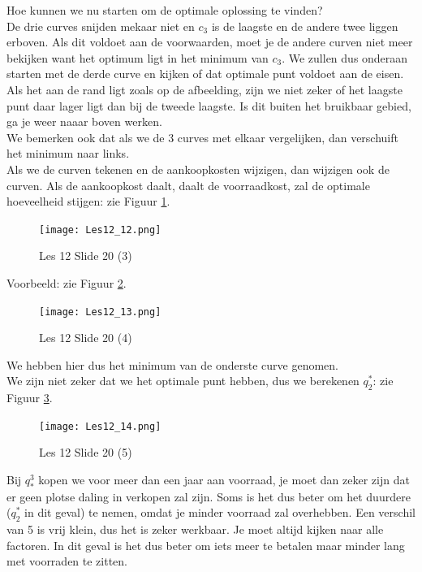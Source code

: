 \documentclass[10pt,a4paper]{report}
\begin{document}
Hoe kunnen we nu starten om de optimale oplossing te vinden? \\
De drie curves snijden mekaar niet en $c_{3}$ is de laagste en de andere twee liggen erboven. Als dit voldoet aan de voorwaarden, moet je de andere curven niet meer bekijken want het optimum ligt in het minimum van $c_{3}$. We zullen dus onderaan starten met de derde curve en kijken of dat optimale punt voldoet aan de eisen. Als het aan de rand ligt zoals op de afbeelding, zijn we niet zeker of het laagste punt daar lager ligt dan bij de tweede laagste. Is dit buiten het bruikbaar gebied, ga je weer naaar boven werken.\\
We bemerken ook dat als we de 3 curves met elkaar vergelijken, dan verschuift het minimum naar links. \\
Als we de curven tekenen en de aankoopkosten wijzigen, dan wijzigen ook de curven. Als de aankoopkost daalt, daalt de voorraadkost, zal de optimale hoeveelheid stijgen: zie Figuur \ref{les12_12}.\\

\begin{figure}[h!]
\centering
\texttt{[image: Les12\_12.png]}
\caption{Les 12 Slide 20 (3)} 
\label{les12_12}
\end{figure}

Voorbeeld: zie Figuur \ref{les12_13}.\\

\begin{figure}[h!]
\centering
\texttt{[image: Les12\_13.png]}
\caption{Les 12 Slide 20 (4)} 
\label{les12_13}
\end{figure}

We hebben hier dus het minimum van de onderste curve genomen.\\
We zijn niet zeker dat we het optimale punt hebben, dus we berekenen $q_{2}^{*}$: zie Figuur \ref{les12_14}. \\

\begin{figure}[h!]
\centering
\texttt{[image: Les12\_14.png]}
\caption{Les 12 Slide 20 (5)} 
\label{les12_14}
\end{figure}

Bij $q_{*}^{3}$ kopen we voor meer dan een jaar aan voorraad, je moet dan zeker zijn dat er geen plotse daling in verkopen zal zijn. Soms is het dus beter om het duurdere ($q_{2}^{*}$ in dit geval) te nemen, omdat je minder voorraad zal overhebben. Een verschil van 5 is vrij klein, dus het is zeker werkbaar. Je moet altijd kijken naar alle factoren. In dit geval is het dus beter om iets meer te betalen maar minder lang met voorraden te zitten.
\end{document}
